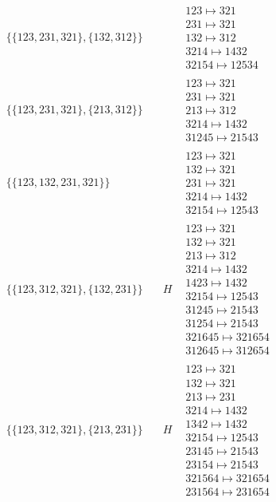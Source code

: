 \begin{tiny}
\begin{align}
\begin{matrix}
\end{matrix}
\\
\{\{123, 231, 321\}, \{132, 312\}\}
\quad
&
\phantom{.}
&
\begin{matrix}
123 \mapsto 321\\231 \mapsto 321\\132 \mapsto 312\\3214 \mapsto 1432\\32154 \mapsto 12534
\end{matrix}
\\
\{\{123, 231, 321\}, \{213, 312\}\}
\quad
&
\phantom{.}
&
\begin{matrix}
123 \mapsto 321\\231 \mapsto 321\\213 \mapsto 312\\3214 \mapsto 1432\\31245 \mapsto 21543
\end{matrix}
\\
\{\{123, 132, 231, 321\}\}
\quad
&
\phantom{.}
&
\begin{matrix}
123 \mapsto 321\\132 \mapsto 321\\231 \mapsto 321\\3214 \mapsto 1432\\32154 \mapsto 12543
\end{matrix}
\\
\{\{123, 312, 321\}, \{132, 231\}\}
\quad
&
H
&
\begin{matrix}
123 \mapsto 321\\132 \mapsto 321\\213 \mapsto 312\\3214 \mapsto 1432\\1423 \mapsto 1432\\32154 \mapsto 12543\\31245 \mapsto 21543\\31254 \mapsto 21543\\321645 \mapsto 321654\\312645 \mapsto 312654
\end{matrix}
\\
\{\{123, 312, 321\}, \{213, 231\}\}
\quad
&
H
&
\begin{matrix}
123 \mapsto 321\\132 \mapsto 321\\213 \mapsto 231\\3214 \mapsto 1432\\1342 \mapsto 1432\\32154 \mapsto 12543\\23145 \mapsto 21543\\23154 \mapsto 21543\\321564 \mapsto 321654\\231564 \mapsto 231654

\end{matrix}
\end{align}
\end{tiny}
